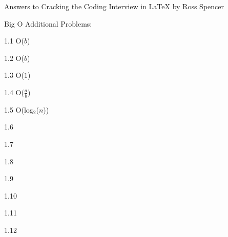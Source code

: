 \documentclass{article}
\begin{document}
Answers to Cracking the Coding Interview in \LaTeX
by Ross Spencer


Big O Additional Problems:

1.1 O($b$)

1.2 O($b$)

1.3 O($1$)

1.4 O($\frac{a}{b}$)

1.5 O(log$_{2}$($n$))

1.6 

1.7 

1.8

1.9

1.10

1.11

1.12
\end{document}
